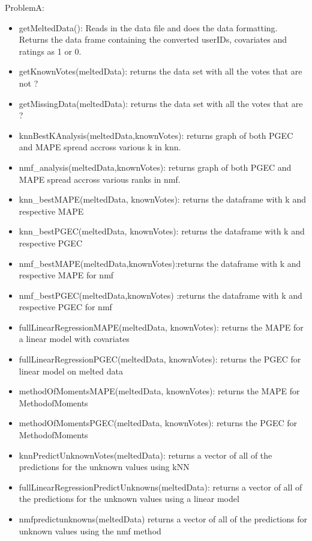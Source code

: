 \documentclass{article}
\begin{document}
\item ProblemA:

    \begin{itemize}
        \item getMeltedData(): Reads in the data file and does the data formatting. Returns the data frame containing the converted userIDs, covariates and ratings as 1 or 0.
        \item getKnownVotes(meltedData): returns the data set with all the votes that are not ? 
        \item getMissingData(meltedData): returns the data set with all the votes that are ?
        \item knnBestKAnalysis(meltedData,knownVotes): returns graph of both PGEC and MAPE spread accross various k in knn.
        \item nmf\_analysis(meltedData,knownVotes): returns graph of both PGEC and MAPE spread accross various ranks in nmf.
        \item knn\_bestMAPE(meltedData, knownVotes): returns the dataframe with k and respective MAPE
        \item knn\_bestPGEC(meltedData, knownVotes): returns the dataframe with k and respective PGEC
        \item nmf\_bestMAPE(meltedData,knownVotes):returns the dataframe with k and respective MAPE for nmf
        \item nmf\_bestPGEC(meltedData,knownVotes) :returns the dataframe with k and respective PGEC for nmf
        \item fullLinearRegressionMAPE(meltedData, knownVotes): returns the MAPE for a linear model with covariates
        \item fullLinearRegressionPGEC(meltedData, knownVotes): returns the PGEC for linear model on melted data
        \item methodOfMomentsMAPE(meltedData, knownVotes): returns the MAPE for MethodofMoments
        \item methodOfMomentsPGEC(meltedData, knownVotes): returns the PGEC for MethodofMoments
        \item knnPredictUnknownVotes(meltedData): returns a vector of all of the predictions for the unknown values using kNN
        \item fullLinearRegressionPredictUnknowns(meltedData): returns a vector of all of the predictions for the unknown values using a linear model
        \item nmfpredictunknowns(meltedData) returns a vector of all of the predictions for unknown values using the nmf method

    \end{itemize}
\end{document}
